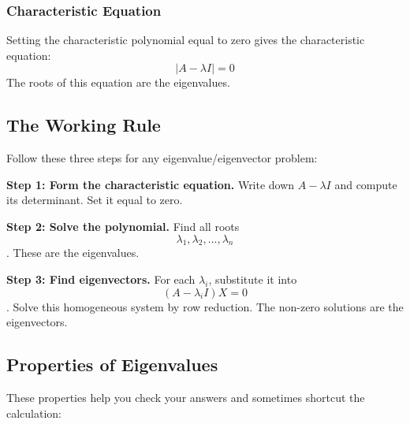 \documentclass[
]{article}
\begin{document}
\subsubsection{Characteristic Equation}\label{characteristic-equation}

Setting the characteristic polynomial equal to zero gives the
characteristic equation:
\[
|A - \lambda I| = 0
\]
The roots of this equation are the eigenvalues.

\subsection{The Working Rule}\label{the-working-rule}

Follow these three steps for any eigenvalue/eigenvector problem:

\textbf{Step 1: Form the characteristic equation.} Write down
\(A - \lambda I\) and compute its determinant. Set it equal to zero.

\textbf{Step 2: Solve the polynomial.} Find all roots
\[
\lambda_1, \lambda_2, \dots, \lambda_n
\]
. These are the eigenvalues.

\textbf{Step 3: Find eigenvectors.} For each \(\lambda_i\), substitute
it into
\[
(A - \lambda_i I)X = 0
\]
. Solve this homogeneous system by row reduction. The non-zero solutions
are the eigenvectors.

\subsection{Properties of Eigenvalues}\label{properties-of-eigenvalues}

These properties help you check your answers and sometimes shortcut the
calculation:
\end{document}
